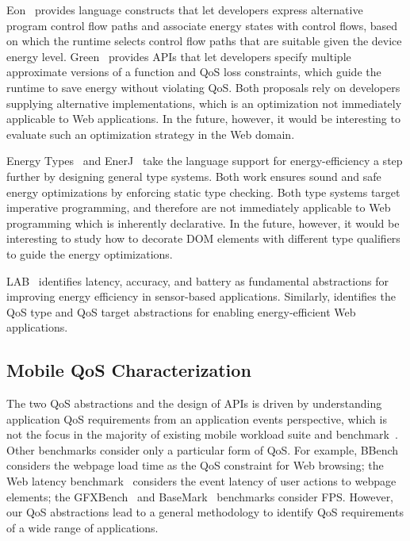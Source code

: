 Eon~\cite{eon} provides language constructs that let developers express alternative program control flow paths and associate energy states with control flows, based on which the runtime selects control flow paths that are suitable given the device energy level. Green~\cite{green} provides APIs that let developers specify multiple approximate versions of a function and QoS loss constraints, which guide the runtime to save energy without violating QoS. Both proposals rely on developers supplying alternative implementations, which is an optimization not immediately applicable to Web applications. In the future, however, it would be interesting to evaluate such an optimization strategy in the Web domain.

Energy Types~\cite{energytypes} and EnerJ~\cite{enerJ} take the language support for energy-efficiency a step further by designing general type systems. Both work ensures sound and safe energy optimizations by enforcing static type checking. Both type systems target imperative programming, and therefore are not immediately applicable to Web programming which is inherently declarative. In the future, however, it would be interesting to study how to decorate DOM elements with different type qualifiers to guide the energy optimizations.

LAB~\cite{lab} identifies latency, accuracy, and battery as fundamental abstractions for improving energy efficiency in sensor-based applications. Similarly, \greenweb identifies the QoS type and QoS target abstractions for enabling energy-efficient Web applications.

\subsection{Mobile QoS Characterization}
\label{sec:lang:related:qos}

The two QoS abstractions and the design of \greenweb APIs is driven by understanding application QoS requirements from an application events perspective, which is not the focus in the majority of existing mobile workload suite and benchmark~\cite{jsbench,BrowsingBench,BrowserMark,MobileBench,Moby,Vellamo,AnTuTu,sunspider,Octane,Kraken,GeekBench}. Other benchmarks consider only a particular form of QoS. For example, BBench~\cite{BBench} considers the webpage load time as the QoS constraint for Web browsing; the Web latency benchmark~\cite{WebLatencyBenchmark} considers the event latency of user actions to webpage elements; the GFXBench~\cite{GFXBench} and BaseMark~\cite{BaseMark} benchmarks consider FPS. However, our QoS abstractions lead to a general methodology to identify QoS requirements of a wide range of applications.
